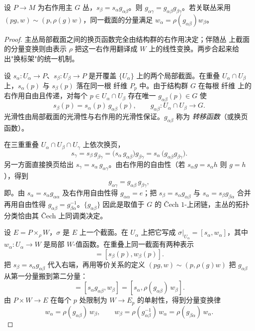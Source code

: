 \begin{proposition}[转移函数与关联丛分量]
设 $P\to M$ 为右作用主 $G$ 丛，$s_\beta=s_\alpha g_{\alpha\beta}$。则 $g_{\alpha\gamma}=g_{\alpha\beta}g_{\beta\gamma}$。若关联丛采用 $(pg,w)\sim(p,\rho(g)w)$，同一截面的分量满足 $w_\alpha=\rho(g_{\alpha\beta})w_\beta$。
\end{proposition}
\begin{proof}
主丛局部截面之间的换页函数完全由结构群的右作用决定；伴随丛 上截面的分量变换则由表示 $\rho$ 把这一右作用翻译成 $W$ 上的线性变换。两步合起来给出"换标架"的统一机制。

设 $s_\alpha:U_\alpha\to P$、$s_\beta:U_\beta\to P$ 是开覆盖 $\{U_\alpha\}$ 上的两个局部截面。在重叠 $U_\alpha\cap U_\beta$ 上，$s_\alpha(p)$ 与 $s_\beta(p)$ 落在同一根 纤维 $P_p$ 中。由于结构群 $G$ 在每根 纤维 上的右作用自由且传递，对每个 $p\in U_\alpha\cap U_\beta$ 存在唯一 $g_{\alpha\beta}(p)\in G$ 使
\begin{equation*}
 s_\beta(p)=s_\alpha(p)\,g_{\alpha\beta}(p),
 \qquad g_{\alpha\beta}:U_\alpha\cap U_\beta\to G.
\end{equation*}
光滑性由局部截面的光滑性与右作用的光滑性保证。$g_{\alpha\beta}$ 称为 \emph{转移函数}（或换页函数）。

在三重重叠 $U_\alpha\cap U_\beta\cap U_\gamma$ 上依次换页，
\begin{equation*}
 s_\gamma
 =s_\beta\,g_{\beta\gamma}
 =\bigl(s_\alpha\,g_{\alpha\beta}\bigr)g_{\beta\gamma}
 =s_\alpha\,\bigl(g_{\alpha\beta}g_{\beta\gamma}\bigr).
\end{equation*}
另一方面直接换页给出 $s_\gamma=s_\alpha\,g_{\alpha\gamma}$。由右作用的自由性（若 $s_\alpha g=s_\alpha h$ 则 $g=h$），得到
\begin{equation*}
 g_{\alpha\gamma}=g_{\alpha\beta}\,g_{\beta\gamma},
\end{equation*}
即。由 $s_\alpha=s_\alpha g_{\alpha\alpha}$ 及右作用自由性得 $g_{\alpha\alpha}=e$；把 $s_\beta=s_\alpha g_{\alpha\beta}$ 与 $s_\alpha=s_\beta g_{\beta\alpha}$ 合并再用自由性得 $g_{\alpha\beta}=g_{\beta\alpha}^{-1}$。$\{g_{\alpha\beta}\}$ 因此是取值于 $G$ 的 \v Cech $1$-上闭链，主丛的拓扑分类恰由其 \v Cech 上同调类决定。

设 $E=P\times_\rho W$，$\sigma$ 是 $E$ 上一个截面。在 $U_\alpha$ 上把它写成 $\sigma|_{U_\alpha}=[s_\alpha,w_\alpha]$，其中 $w_\alpha:U_\alpha\to W$ 是局部 $W$-值函数。在重叠上同一截面有两种表示
\begin{equation*}
 [s_\alpha(p),w_\alpha(p)]=[s_\beta(p),w_\beta(p)].
\end{equation*}
把 $s_\beta=s_\alpha g_{\alpha\beta}$ 代入右端，再用等价关系的定义 $(p g,w)\sim(p,\rho(g)w)$ 把 $g_{\alpha\beta}$ 从第一分量搬到第二分量：
\begin{equation*}
 [s_\alpha,w_\alpha]
 =[s_\alpha g_{\alpha\beta},w_\beta]
 =[s_\alpha,\rho(g_{\alpha\beta})\,w_\beta].
\end{equation*}
由 $P\times W\to E$ 在每个 $p$ 处限制为 $W\to E_p$ 的单射性，得到分量变换律
\begin{equation*}
 w_\alpha=\rho(g_{\alpha\beta})\,w_\beta,
 \qquad
 w_\beta=\rho(g_{\alpha\beta}^{-1})\,w_\alpha
 =\rho(g_{\beta\alpha})\,w_\alpha.
\end{equation*}


\end{proof}
